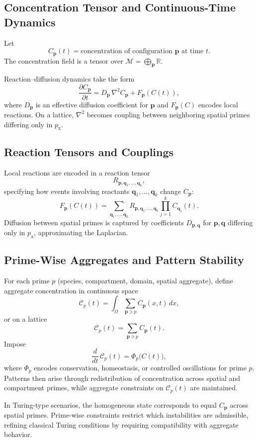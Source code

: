 \documentclass[11pt]{article}
\begin{document}
\subsection{Concentration Tensor and Continuous-Time Dynamics}
Let
\[
C_{\mathbf{p}}(t)
=
\text{concentration of configuration }
\mathbf{p}
\text{ at time } t.
\]
The concentration field is a tensor over $\mathcal{M} = \bigoplus_{\mathbf{p}} \mathbb{R}$.

Reaction--diffusion dynamics take the form
\[
\frac{\partial C_{\mathbf{p}}}{\partial t}
=
D_{\mathbf{p}}\,\nabla^2 C_{\mathbf{p}}
+
F_{\mathbf{p}}(C(t)),
\]
where $D_{\mathbf{p}}$ is an effective diffusion coefficient for $\mathbf{p}$ and $F_{\mathbf{p}}(C)$ encodes local reactions. On a lattice, $\nabla^2$ becomes coupling between neighboring spatial primes differing only in $p_{\text{x}}$.

\subsection{Reaction Tensors and Couplings}
Local reactions are encoded in a reaction tensor
\[
R_{\mathbf{p},\mathbf{q}_1,\dots,\mathbf{q}_k},
\]
specifying how events involving reactants $\mathbf{q}_1,\dots,\mathbf{q}_k$ change $C_{\mathbf{p}}$:
\[
F_{\mathbf{p}}(C(t))
=
\sum_{\mathbf{q}_1,\dots,\mathbf{q}_k}
R_{\mathbf{p},\mathbf{q}_1,\dots,\mathbf{q}_k}
\prod_{j=1}^k C_{\mathbf{q}_j}(t).
\]
Diffusion between spatial primes is captured by coefficients $D_{\mathbf{p},\mathbf{q}}$ for $\mathbf{p},\mathbf{q}$ differing only in $p_{\text{x}}$, approximating the Laplacian.

\subsection{Prime-Wise Aggregates and Pattern Stability}
For each prime $p$ (species, compartment, domain, spatial aggregate), define aggregate concentration in continuous space
\[
\mathcal{C}_p(t)
=
\int_{\Omega}
\sum_{\mathbf{p} \ni p}
C_{\mathbf{p}}(x,t)\,dx,
\]
or on a lattice
\[
\mathcal{C}_p(t)
=
\sum_{\mathbf{p} \ni p} C_{\mathbf{p}}(t).
\]
Impose
\[
\frac{d}{dt}\,\mathcal{C}_p(t)
=
\Phi_p\big(C(t)\big),
\]
where $\Phi_p$ encodes conservation, homeostasis, or controlled oscillations for prime $p$. Patterns then arise through redistribution of concentration across spatial and compartment primes, while aggregate constraints on $\mathcal{C}_p(t)$ are maintained.

In Turing-type scenarios, the homogeneous state corresponds to equal $C_{\mathbf{p}}$ across spatial primes. Prime-wise constraints restrict which instabilities are admissible, refining classical Turing conditions by requiring compatibility with aggregate behavior.
\end{document}
